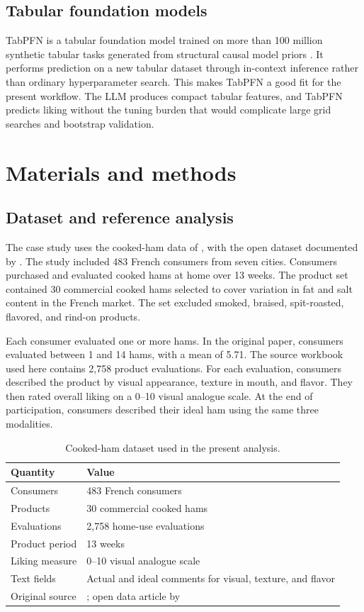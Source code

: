 \documentclass[12pt]{article}
\begin{document}
\subsection{Tabular foundation models}

TabPFN is a tabular foundation model trained on more than 100 million synthetic tabular tasks generated from structural causal model priors \citep{hollmann2025tabpfn}. It performs prediction on a new tabular dataset through in-context inference rather than ordinary hyperparameter search. This makes TabPFN a good fit for the present workflow. The LLM produces compact tabular features, and TabPFN predicts liking without the tuning burden that would complicate large grid searches and bootstrap validation.

\section{Materials and methods}

\subsection{Dataset and reference analysis}

The case study uses the cooked-ham data of \citet{mahieu2022ifc}, with the open dataset documented by \citet{visalli2024hamdata}. The study included 483 French consumers from seven cities. Consumers purchased and evaluated cooked hams at home over 13 weeks. The product set contained 30 commercial cooked hams selected to cover variation in fat and salt content in the French market. The set excluded smoked, braised, spit-roasted, flavored, and rind-on products.

Each consumer evaluated one or more hams. In the original paper, consumers evaluated between 1 and 14 hams, with a mean of 5.71. The source workbook used here contains 2,758 product evaluations. For each evaluation, consumers described the product by visual appearance, texture in mouth, and flavor. They then rated overall liking on a 0--10 visual analogue scale. At the end of participation, consumers described their ideal ham using the same three modalities.

\begin{table}[ht]
\centering
\caption{Cooked-ham dataset used in the present analysis.}
\label{tab:data}
\begin{tabular}{ll}
\toprule
Quantity & Value \\
\midrule
Consumers & 483 French consumers \\
Products & 30 commercial cooked hams \\
Evaluations & 2,758 home-use evaluations \\
Product period & 13 weeks \\
Liking measure & 0--10 visual analogue scale \\
Text fields & Actual and ideal comments for visual, texture, and flavor \\
Original source & \citet{mahieu2022ifc}; open data article by \citet{visalli2024hamdata} \\
\bottomrule
\end{tabular}
\end{table}
\end{document}

